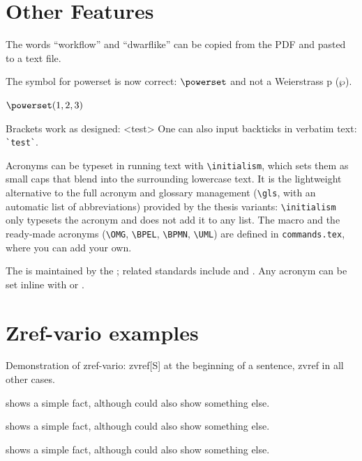 \documentclass[../thesis-example-en]{subfiles}
\begin{document}

\section{Other Features}

\begin{ltgexample}
The words \enquote{workflow} and \enquote{dwarflike} can be copied from the PDF and pasted to a text file.
\end{ltgexample}

\begin{ltgexample}
The symbol for powerset is now correct: $\powerset$ and not a Weierstrass p ($\wp$).

$\powerset({1,2,3})$
\end{ltgexample}

\begin{ltgexample}
Brackets work as designed:
<test>
One can also input backticks in verbatim text: \verb|`test`|.
\end{ltgexample}

Acronyms can be typeset in running text with \verb+\initialism+, which sets them as small caps that blend into the surrounding lowercase text. It is the lightweight alternative to the full acronym and glossary management (\verb+\gls+, with an automatic list of abbreviations) provided by the thesis variants: \verb+\initialism+ only typesets the acronym and does not add it to any list. The macro and the ready-made acronyms (\verb+\OMG+, \verb+\BPEL+, \verb+\BPMN+, \verb+\UML+) are defined in \texttt{commands.tex}, where you can add your own.

\begin{ltgexample}
The \UML is maintained by the \OMG; related standards include \BPEL and \BPMN.
Any acronym can be set inline with  or .
\end{ltgexample}


\section{Zref-vario examples}
\label{sec:ex:vref}

Demonstration of zref-vario: zvref[S] at the beginning of a sentence, zvref in all other cases.

\begin{ltgexample}
 shows a simple fact, although  could also show something else.

 shows a simple fact, although  could also show something else.

 shows a simple fact, although  could also show something else.
\end{ltgexample}
\end{document}
